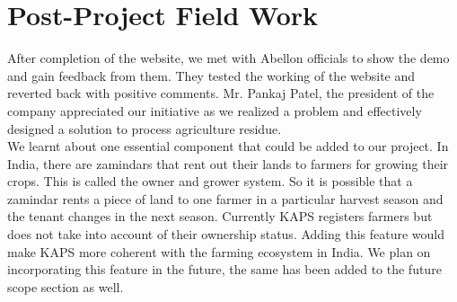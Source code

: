 \documentclass[conference]{IEEEtran}
\begin{document}
\section{Post-Project Field Work}
After completion of the website, we met with Abellon officials to show the demo and gain feedback from them. They tested the working of the website and reverted back with positive comments. Mr. Pankaj Patel, the president of the company appreciated our initiative as we realized a problem and effectively designed a solution to process agriculture residue. \\
We learnt about one essential component that could be added to our project. In India, there are zamindars that rent out their lands to farmers for growing their crops. This is called the owner and grower system. So it is possible that a zamindar rents a piece of land to one farmer in a particular harvest season and the tenant changes in the next season. Currently KAPS registers farmers but does not take into account of their ownership status. Adding this feature would make KAPS more coherent with the farming ecosystem in India. We plan on incorporating this feature in the future, the same has been added to the future scope section as well.
\end{document}
